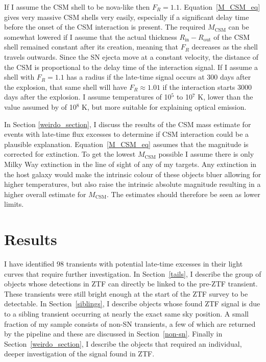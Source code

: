 \documentclass[a4paper,oneside,12pt, class=Latex/Classes/PhDthesisPSnPDF, crop=false]{standalone}
\begin{document}
If I assume the CSM shell to be nova-like then $F_R=1.1$. Equation~\ref{M_CSM_eq} gives very massive CSM shells very easily, especially if a significant delay time before the onset of the CSM interaction is present. The required $M_\text{CSM}$ can be somewhat lowered if I assume that the actual thickness $R_\text{in} - R_\text{out}$ of the CSM shell remained constant after its creation, meaning that $F_R$ decreases as the shell travels outwards. Since the SN ejecta move at a constant velocity, the distance of the CSM is proportional to the delay time of the interaction signal. If I assume a shell with $F_R = 1.1$ has a radius if the late-time signal occurs at 300 days after the explosion, that same shell will have $F_R \approx 1.01$ if the interaction starts 3000 days after the explosion. I assume temperatures of 10$^5$ to 10$^7$ K, lower than the value assumed by \cite{2015cp} of 10$^8$ K, but more suitable for explaining optical emission.

In Section \ref{weirdo_section}, I discuss the results of the CSM mass estimate for events with late-time flux excesses to determine if CSM interaction could be a plausible explanation. Equation~\ref{M_CSM_eq} assumes that the magnitude is corrected for extinction. To get the lowest $M_\text{CSM}$ possible I assume there is only Milky Way extinction in the line of sight of any of my targets. Any extinction in the host galaxy would make the intrinsic colour of these objects bluer allowing for higher temperatures, but also raise the intrinsic absolute magnitude resulting in a higher overall estimate for $M_\text{CSM}$. The estimates should therefore be seen as lower limits.


\section{Results}
\label{Pre-ZTF_results}
I have identified 98 transients with potential late-time excesses in their light curves that require further investigation. In Section~\ref{tails}, I describe the group of objects whose detections in ZTF can directly be linked to the pre-ZTF transient. These transients were still bright enough at the start of the ZTF survey to be detectable. In Section~\ref{siblings}, I describe objects whose found ZTF signal is due to a sibling transient occurring at nearly the exact same sky position. A small fraction of my sample consists of non-SN transients, a few of which are returned by the pipeline and these are discussed in Section~\ref{non-sn}. Finally in Section~\ref{weirdo_section}, I describe the objects that required an individual, deeper investigation of the signal found in ZTF.
\end{document}
